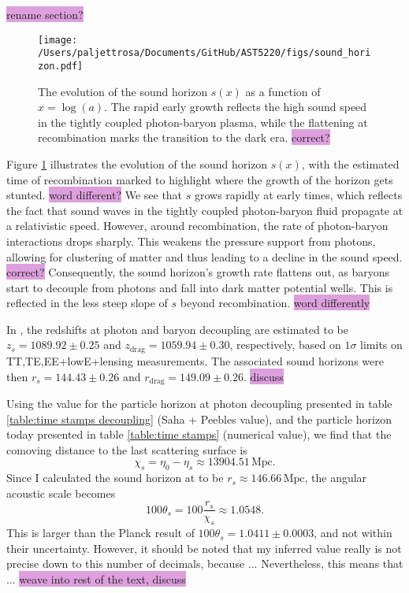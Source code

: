 \documentclass{aa}
\begin{document}
\colorbox{Plum}{rename section?}


\begin{figure}
  \centering
  \texttt{[image: /Users/paljettrosa/Documents/GitHub/AST5220/figs/sound\_horizon.pdf]}
  \caption{The evolution of the sound horizon $s(x)$ as a function of $x = \log(a)$. The rapid early growth reflects the high sound speed in the tightly coupled photon-baryon plasma, while the flattening at recombination marks the transition to the dark era. \colorbox{Plum}{correct?}}\label{fig:sound horizon}
\end{figure}

Figure \ref{fig:sound horizon} illustrates the evolution of the sound horizon $s(x)$, with the estimated time of recombination marked to highlight where the growth of the horizon gets stunted. \colorbox{Plum}{word different?} We see that $s$ grows rapidly at early times, which reflects the fact that sound waves in the tightly coupled photon-baryon fluid propagate at a relativistic speed. However, around recombination, the rate of photon-baryon interactions drops sharply. This weakens the pressure support from photons, allowing for clustering of matter and thus leading to a decline in the sound speed. \colorbox{Plum}{correct?} Consequently, the sound horizon's growth rate flattens out, as baryons start to decouple from photons and fall into dark matter potential wells. This is reflected in the less steep slope of $ s$ beyond recombination. \colorbox{Plum}{word differently}

In \cite{Planck}, the redshifts at photon and baryon decoupling are estimated to be $z_s=1089.92\pm0.25$ and $z_\text{drag} = 1059.94\pm0.30$, respectively, based on $1\sigma$ limits on TT,TE,EE+lowE+lensing measurements. The associated sound horizons were then $r_s=144.43\pm0.26$ and $r_\text{drag} = 149.09\pm0.26$. \colorbox{Plum}{discuss}

Using the value for the particle horizon at photon decoupling presented in table \ref{table:time stamps decoupling} (Saha + Peebles value), and the particle horizon today presented in table \ref{table:time stamps} (numerical value), we find that the comoving distance to the last scattering surface is
\begin{equation*}
  \chi_{s} = \eta_0-\eta_{s} \approx 13904.51\,\text{Mpc}.
\end{equation*}
Since I calculated the sound horizon at to be $r_s \approx 146.66\,\text{Mpc}$, the angular acoustic scale becomes
\begin{equation*}
  100\theta_{s} = 100\frac{r_s}{\chi_{s}} \approx 1.0548.
\end{equation*}
This is larger than the Planck result of $100\theta_{s}=1.0411\pm0.0003$, and not within their uncertainty. However, it should be noted that my inferred value really is not precise down to this number of decimals, because ... Nevertheless, this means that ...  \colorbox{Plum}{weave into rest of the text, discuss}
\end{document}
